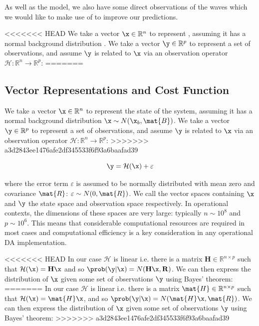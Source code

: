 As well as the model, we also have some direct observations of the waves which we would like to make use of to improve our predictions. 

<<<<<<< HEAD
We take a vector $\x \in \mathbb{R}^n$ to represent , assuming it has a normal background distribution . We take a vector $\y \in \mathbb{R}^p$ to represent a set of observations, and assume $\y$ is related to $\x$ via an observation operator $\mathcal{H}: \mathbb{R}^n \rightarrow \mathbb{R}^p$:
=======
\subsection{Vector Representations and Cost Function}

We take a vector $\x \in \mathbb{R}^n$ to represent the state of the system, assuming it has a normal background distribution $\x \sim N(\x_b,\mat{B})$. We take a vector $\y \in \mathbb{R}^p$ to represent a set of observations, and assume $\y$ is related to $\x$ via an observation operator $\mathcal{H}: \mathbb{R}^n \rightarrow \mathbb{R}^p$:
>>>>>>> a3d2843ee1476afe2df345533f6f93a6baafad39

\[
\y = \mathcal{H}(\x) + \varepsilon
\]

where the error term $\varepsilon$ is assumed to be normally distributed with mean zero and covariance $\mat{R}$: $\varepsilon \sim N(0,\mat{R})$. We call the vector spaces containing $\x$ and $\y$ the state space and observation space respectively. In operational contexts, the dimensions of these spaces are very large: typically $n \sim 10^8$ and $p \sim 10^6$. This means that considerable computational resources are required in most cases and computational efficiency is a key consideration in any operational DA implementation.

<<<<<<< HEAD
In our case $\mathcal{H}$ is linear i.e. there is a matrix $\mathbf{H} \in \mathbb{R}^{n \times p}$ such that $\mathcal{H}(\x) = \mathbf{H}\x$\remove{,} and so $\prob(\y|\x) = N(\mathbf{H}\x,\mathbf{R})$. We can then express the distribution of $\x$ given some set of observations $\y$ using Bayes' theorem:
=======
In our case $\mathcal{H}$ is linear i.e. there is a matrix $\mat{H} \in \mathbb{R}^{n \times p}$ such that $\mathcal{H}(\x) = \mat{H}\x$, and so $\prob(\y|\x) = N(\mat{H}\x,\mat{R})$. We can then express the distribution of $\x$ given some set of observations $\y$ using Bayes' theorem:
>>>>>>> a3d2843ee1476afe2df345533f6f93a6baafad39

